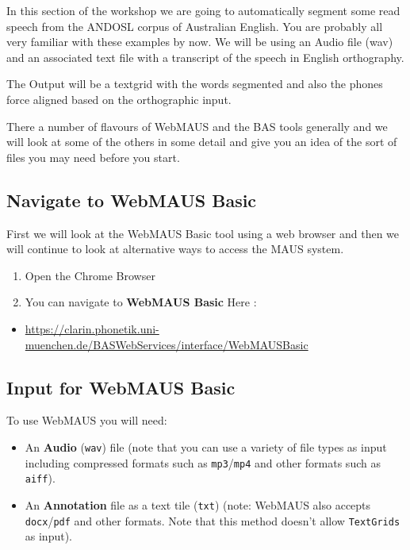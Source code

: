 \documentclass[
  11pt,
]{article}
\providecommand{\tightlist}{%
  \setlength{\itemsep}{0pt}\setlength{\parskip}{0pt}}
\begin{document}
In this section of the workshop we are going to automatically segment
some read speech from the ANDOSL corpus of Australian English. You are
probably all very familiar with these examples by now. We will be using
an Audio file (wav) and an associated text file with a transcript of the
speech in English orthography.

The Output will be a textgrid with the words segmented and also the
phones force aligned based on the orthographic input.

There a number of flavours of WebMAUS and the BAS tools generally and we
will look at some of the others in some detail and give you an idea of
the sort of files you may need before you start.

\hypertarget{navigate-to-webmaus-basic}{%
\subsection{Navigate to WebMAUS Basic}\label{navigate-to-webmaus-basic}}

First we will look at the WebMAUS Basic tool using a web browser and
then we will continue to look at alternative ways to access the MAUS
system.

\begin{enumerate}
\def\labelenumi{\arabic{enumi}.}
\tightlist
\item
  Open the Chrome Browser
\item
  You can navigate to \textbf{WebMAUS Basic} Here :
\end{enumerate}

\begin{itemize}
\tightlist
\item
  \url{https://clarin.phonetik.uni-muenchen.de/BASWebServices/interface/WebMAUSBasic}
\end{itemize}

\hypertarget{input-for-webmaus-basic}{%
\subsection{Input for WebMAUS Basic}\label{input-for-webmaus-basic}}

To use WebMAUS you will need:

\begin{itemize}
\tightlist
\item
  An \textbf{Audio} (\texttt{wav}) file (note that you can use a variety
  of file types as input including compressed formats such as
  \texttt{mp3}/\texttt{mp4} and other formats such as \texttt{aiff}).
\item
  An \textbf{Annotation} file as a text tile (\texttt{txt}) (note:
  WebMAUS also accepts \texttt{docx}/\texttt{pdf} and other formats.
  Note that this method doesn't allow \texttt{TextGrids} as input).
\end{itemize}
\end{document}
